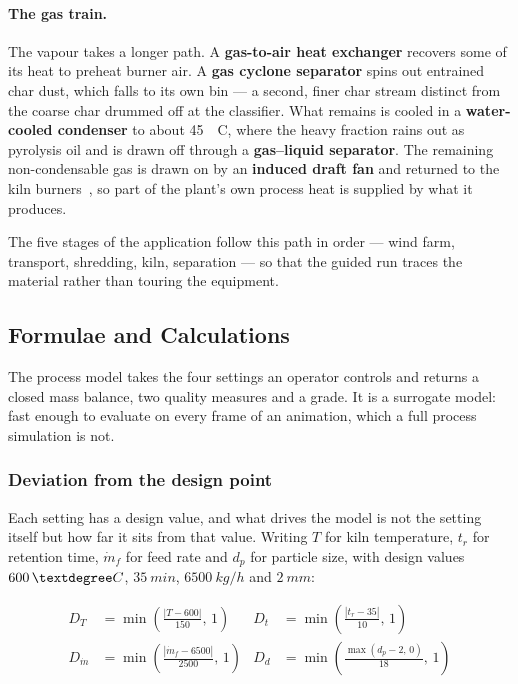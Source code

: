 \paragraph{The gas train.}
The vapour takes a longer path. A \textbf{gas-to-air heat exchanger} recovers some of its heat to preheat burner air. A \textbf{gas cyclone separator} spins out entrained char dust, which falls to its own bin --- a second, finer char stream distinct from the coarse char drummed off at the classifier. What remains is cooled in a \textbf{water-cooled condenser} to about \SI{45}{\textdegree C}, where the heavy fraction rains out as pyrolysis oil and is drawn off through a \textbf{gas--liquid separator}. The remaining non-condensable gas is drawn on by an \textbf{induced draft fan} and returned to the kiln burners~\cite{akesson,bladegas}, so part of the plant's own process heat is supplied by what it produces.

The five stages of the application follow this path in order --- wind farm, transport, shredding, kiln, separation --- so that the guided run traces the material rather than touring the equipment.

\subsection{Formulae and Calculations}
\label{sec:formulae}

The process model takes the four settings an operator controls and returns a closed mass balance, two quality measures and a grade. It is a surrogate model: fast enough to evaluate on every frame of an animation, which a full process simulation is not.

\subsubsection{Deviation from the design point}

Each setting has a design value, and what drives the model is not the setting itself but how far it sits from that value. Writing $T$ for kiln temperature, $t_r$ for retention time, $\dot{m}_f$ for feed rate and $d_p$ for particle size, with design values $\SI{600}{\textdegree C}$, $\SI{35}{min}$, $\SI{6500}{kg/h}$ and $\SI{2}{mm}$:

\begin{align}
  D_T   &= \min\!\left(\frac{|T - 600|}{150},\, 1\right) &
  D_{t}  &= \min\!\left(\frac{|t_r - 35|}{10},\, 1\right) \\[2pt]
  D_{\dot{m}} &= \min\!\left(\frac{|\dot{m}_f - 6500|}{2500},\, 1\right) &
  D_{d}  &= \min\!\left(\frac{\max(d_p - 2,\, 0)}{18},\, 1\right)
\end{align}

